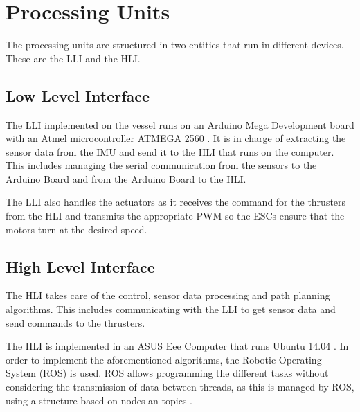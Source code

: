 \section{Processing Units}\label{sec:ControlComputation}
The processing units are structured in two entities that run in different devices. These are the LLI and the HLI.

\subsection{Low Level Interface} 
The LLI implemented on the vessel runs on an Arduino Mega Development board with an Atmel microcontroller ATMEGA 2560 \cite{Mega2560}. It is in charge of extracting the sensor data from the IMU and send it to the HLI that runs on the computer. This includes managing the serial communication from the sensors to the Arduino Board and from the Arduino Board to the HLI. 

The LLI also handles the actuators as it receives the command for the thrusters from the HLI and transmits the appropriate PWM so the ESCs ensure that the motors turn at the desired speed.

\subsection{High Level Interface}
The HLI takes care of the control, sensor data processing and path planning algorithms. This includes communicating with the LLI to get sensor data and send commands to the thrusters. 

The HLI is implemented in an ASUS Eee Computer \cite{asus} that runs Ubuntu 14.04 \cite{ubuntu}. In order to implement the aforementioned algorithms, the Robotic Operating System (ROS) is used. ROS allows programming the different tasks without considering the transmission of data between threads, as this is managed by ROS, using a structure based on nodes an topics \cite{ROS}.
